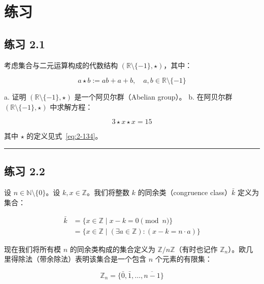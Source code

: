 \chapter*{练习}

\section*{练习 2.1}

考虑集合与二元运算构成的代数结构 $ (\mathbb{R} \setminus \{-1\}, \star) $，其中：

\begin{equation}
a \star b := ab + a + b, \quad a, b \in \mathbb{R} \setminus \{-1\}
\tag{2.134}\label{eq:2-134}
\end{equation}

a. 证明 $ (\mathbb{R} \setminus \{-1\}, \star) $ 是一个阿贝尔群（Abelian group）。 b. 在阿贝尔群 $ (\mathbb{R} \setminus \{-1\}, \star) $ 中求解方程：

\begin{equation*}
3 \star x \star x = 15
\end{equation*}

其中 $ \star $ 的定义见式~\eqref{eq:2-134}。

\medskip\hrule\medskip

\section*{练习 2.2}

设 $ n \in \mathbb{N} \setminus \{0\} $。设 $ k, x \in \mathbb{Z} $。我们将整数 $ k $ 的同余类（congruence class）$ \bar{k} $ 定义为集合：

\begin{equation*}
\begin{aligned}
\bar{k} &= \{x \in \mathbb{Z} \mid x - k = 0 \pmod n\} \\
&= \{x \in \mathbb{Z} \mid (\exists a \in \mathbb{Z}): (x - k = n \cdot a)\}
\end{aligned}
\end{equation*}

现在我们将所有模 $ n $ 的同余类构成的集合定义为 $ \mathbb{Z}/n\mathbb{Z} $（有时也记作 $ \mathbb{Z}_n $）。欧几里得除法（带余除法）表明该集合是一个包含 $ n $ 个元素的有限集：

\begin{equation*}
\mathbb{Z}_n = \{\bar{0}, \bar{1}, \ldots, \overline{n - 1}\}
\end{equation*}

